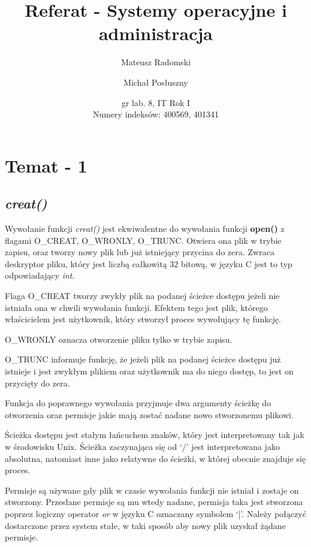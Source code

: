 \documentclass{article}
\title{Referat - Systemy operacyjne i administracja}
\author{Mateusz Radomski \and Michał Posłuszny}
\date{gr lab. 8, IT Rok I \\ Numery indeksów: 400569, 401341 }
\begin{document}
\maketitle
\section{Temat - 1}
\subsection{\textit{creat()}}
Wywołanie funkcji \textit{creat()} jest ekwiwalentne do wywołania funkcji \textbf{open()} z flagami O\_CREAT, O\_WRONLY, O\_TRUNC.
Otwiera ona plik w trybie zapisu, oraz tworzy nowy plik lub już istniejący przycina do zera.
Zwraca deskryptor pliku, który jest liczbą całkowitą 32 bitową, w języku C jest to typ odpowiadający \textit{int}.

Flaga O\_CREAT tworzy zwykły plik na podanej ścieżce dostępu jeżeli nie istniała ona w chwili wywołania funkcji. Efektem tego jest plik, którego właścicielem jest użytkownik, który stworzył proces wywołujący tę funkcję.

O\_WRONLY oznacza otworzenie pliku tylko w trybie zapisu.

O\_TRUNC informuje funkcję, że jeżeli plik na podanej ścieżce dostępu już istnieje i jest zwykłym plikiem oraz użytkownik ma do niego dostęp, to jest on przycięty do zera.

Funkcja do poprawnego wywołania przyjmuje dwa argumenty ścieżkę do otworzenia oraz permisje jakie mają zostać nadane nowo stworzonemu plikowi.

Ścieżka dostępu jest stałym łańcuchem znaków, który jest interpretowany tak jak w środowisku Unix.
Ścieżka zaczynająca się od `/' jest interpretowana jako absolutna, natomiast inne jako relatywne do
ścieżki, w której obecnie znajduje się proces.

Permisje są używane gdy plik w czasie wywołania funkcji nie istniał i zostaje on stworzony.
Przesłane permisje są mu wtedy nadane, permisja taka jest stworzona poprzez logiczny operator
\textit{or} w języku C oznaczany symbolem `|'. Należy połączyć dostarczone przez system stałe,
w taki sposób aby nowy plik uzyskał żądane permisje.
\end{document}
